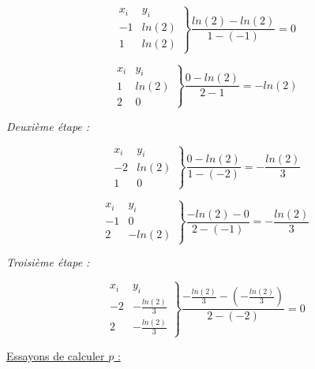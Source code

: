 \documentclass[12pt, letterpaper]{article}
\begin{document}
\begin{enumerate}
  \begin{equation*}
    \left.
    \begin{array}{ll}
      x_i & y_i \\
      -1 & ln(2) \\
      1 & ln(2)
    \end{array}
    \right\}
    \frac{ln(2) - ln(2)}{1 - (-1)} = 0
  \end{equation*}

  \begin{equation*}
    \left.
    \begin{array}{ll}
      x_i & y_i \\
      1 & ln(2) \\
      2 & 0
    \end{array}
    \right\}
    \frac{0 - ln(2)}{2 - 1} = - ln(2)
  \end{equation*}

  \textit{Deuxième étape :}

  \begin{equation*}
    \left.
    \begin{array}{ll}
      x_i & y_i \\
      -2 & ln(2) \\
      1 & 0
    \end{array}
    \right\}
    \frac{0 - ln(2)}{1 - (-2)} = - \frac{ln(2)}{3}
  \end{equation*}

  \begin{equation*}
    \left.
    \begin{array}{ll}
      x_i & y_i \\
      -1 & 0 \\
      2 & - ln(2)
    \end{array}
    \right\}
    \frac{-ln(2) - 0}{2 - (-1)} = - \frac{ln(2)}{3}
  \end{equation*}

  \textit{Troisième étape :}

  \begin{equation*}
    \left.
    \begin{array}{ll}
      x_i & y_i \\
      -2 & - \frac{ln(2)}{3} \\
      2 & - \frac{ln(2)}{3}
    \end{array}
    \right\}
    \frac{- \frac{ln(2)}{3} - (- \frac{ln(2)}{3})}{2 - (-2)} = 0
  \end{equation*}

  \underline{Essayons de calculer $p$ :}


\end{enumerate}
\end{document}
